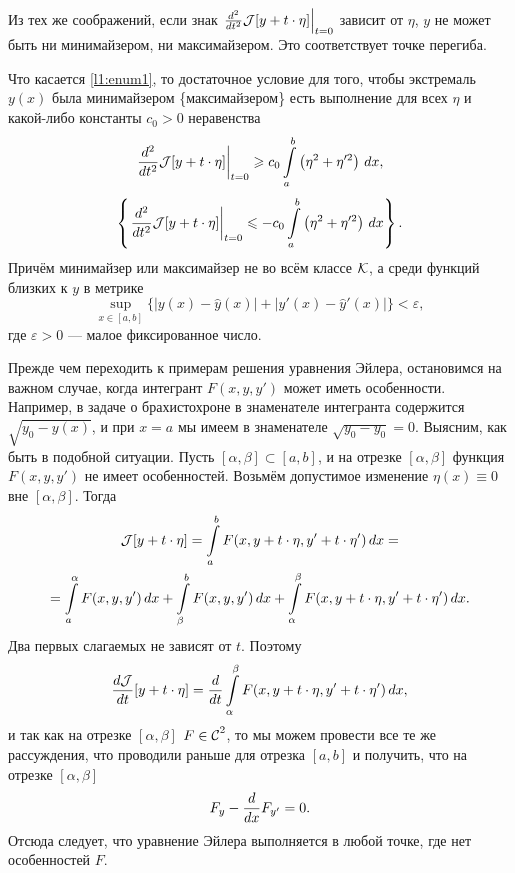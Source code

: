Из тех же соображений, если знак $\left.\dder{}{t}\J[y+t\cdot\eta]\right|_{t=0}$ зависит от $\eta$,  $y$ не может быть ни минимайзером, ни максимайзером. Это соответствует точке перегиба.   

Что касается \ref{l1:enum1}, то достаточное условие для того, чтобы экстремаль $y(x)$ была минимайзером \{максимайзером\} есть выполнение для всех $\eta$ и какой-либо константы $c_0>0$ неравенства
\begin{equation*}
	\left.\dder{}{t}\J[y+t\cdot\eta]\right|_{t=0}\geqslant c_0\int\limits_a^b\left(\eta^2+\eta^{\prime 2}\right)\,\dd{x},
\end{equation*}
\begin{equation*}
	\left\{\left.\dder{}{t}\J[y+t\cdot\eta]\right|_{t=0}\leqslant -c_0\int\limits_a^b\left(\eta^2+\eta^{\prime 2}\right)\,\dd{x}\right\}.
\end{equation*} 
Причём минимайзер или максимайзер  не во всём классе $\mc{K}$, а среди функций близких к $y$ в метрике
\begin{equation*}
	\sup\limits_{x\in{[a,b]}}\{|y(x)-\hat{y}(x)|+|y'(x)-\hat{y}'(x)|\}<\varepsilon,
\end{equation*} 
где $\varepsilon>0$ --- малое фиксированное число.

Прежде чем переходить к примерам решения уравнения Эйлера, остановимся на важном случае, когда интегрант $F(x,y,y')$ может иметь особенности. Например, в задаче о брахистохроне в знаменателе интегранта содержится $\sqrt{y_0-y(x)}$, и при $x=a$ мы имеем в знаменателе $\sqrt{y_0-y_0}=0$. Выясним, как быть в подобной ситуации. Пусть $[\alpha,\beta]\subset[a,b]$, и на отрезке $[\alpha,\beta]$ функция $F(x,y,y')$ не имеет особенностей. Возьмём допустимое изменение $\eta(x)\equiv0$ вне $[\alpha,\beta]$. Тогда 
\begin{multline*}
	\J[y+t\cdot\eta]=\int\limits_a^b F(x,y+t\cdot\eta,y'+t\cdot\eta')\,\dd{x}=\\=\int\limits_a^\alpha F(x,y,y')\,\dd{x}+\int\limits_{\beta}^b F(x,y,y')\,\dd{x}+\int\limits_{\alpha}^{\beta} F(x,y+t\cdot\eta,y'+t\cdot\eta')\,\dd{x}.
\end{multline*} 
Два первых слагаемых не зависят от $t$. Поэтому
\begin{equation*}
	\der{\J}{t}[y+t\cdot\eta]=\der{}{t}\int\limits_{\alpha}^{\beta} F(x,y+t\cdot\eta,y'+t\cdot\eta')\,\dd{x},
\end{equation*} 
и так как на отрезке $[\alpha,\beta]$ $F\in\Cfn[]{2}$, то мы можем провести все те же рассуждения, что проводили раньше для отрезка $[a,b]$ и получить, что на отрезке $[\alpha,\beta]$
\begin{equation*}
	F_y-\der{}{x}F_{y'}=0.
\end{equation*} 
Отсюда следует, что уравнение Эйлера выполняется в любой точке, где нет особенностей $F$. 

